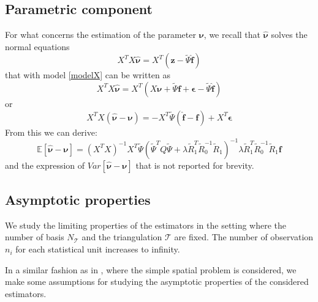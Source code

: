 \subsection{Parametric component}
For what concerns the estimation of the parameter $\bm{\nu}$, we recall that $\hat{\bm{\nu}}$ solves the normal equations
\begin{equation}
    X^T X \hat{\bm{\nu}} = X^T \left( \bm{z} - \tilde{\Psi} \hat{\bm{f}} \right)
\end{equation}
that with model \ref{modelX} can be written as
\begin{equation}
    X^T X \hat{\bm{\nu}} = 
    X^T \left( X \bm{\nu} + \tilde{\Psi} \bm{f} + \bm{\epsilon}
    - \tilde{\Psi} \hat{\bm{f}} \right)
\end{equation}
or
\begin{equation}
    X^T X \left(\hat{\bm{\nu}} - \bm{\nu}\right)= -
    X^T \tilde{\Psi} \left( \hat{\bm{f}} - \bm{f} \right)
    + X^T \bm{\epsilon}
\end{equation}
From this we can derive:
\begin{equation}    
    \mathbb{E}\left[\hat{\bm{\nu}} - \bm{\nu}\right] =
    \left(X^T X\right)^{-1} X^T
    \tilde{\Psi}\left(\tilde{\Psi}^TQ\tilde{\Psi} +\lambda \tilde{R}_1^T \tilde{R}_0^{-1} \tilde{R}_1 \right)^{-1}
    \lambda \tilde{R}_1^T \tilde{R}_0^{-1} \tilde{R}_1 \bm{f}
\end{equation}
and the expression of $Var \left[\hat{\bm{\nu}} - \bm{\nu}\right]$ that is not reported for brevity.

\subsection{Asymptotic properties}
We study the limiting properties of the estimators in the setting where the number of basis $N_\mathcal{T}$ and the triangulation $\mathcal{T}$ are fixed. The number of observation $n_i$ for each statistical unit increases to infinity.

In a similar fashion as in \cite{sangalli2}, where the simple spatial problem is considered, we make some assumptions for studying the asymptotic properties of the considered estimators.
